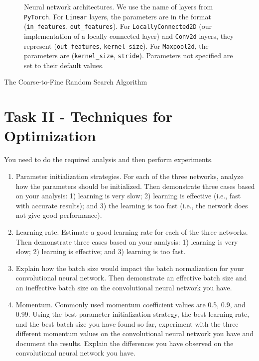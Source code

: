\documentclass[
	12pt, %
]{../Template/fphw}
\begin{document}
\begin{figure}[!htbp]
\begin{tikzpicture}[x=0.75pt,y=0.75pt,yscale=-1,xscale=1]
\end{tikzpicture}
    \caption{Neural network architectures. We use the name of layers from \texttt{PyTorch}\cite{pytorch}. For \texttt{Linear} layers, the parameters are in the format (\texttt{in\_features}, \texttt{out\_features}). For \texttt{LocallyConnected2D} (our implementation of a locally connected layer) and \texttt{Conv2d} layers, they represent (\texttt{out\_features}, \texttt{kernel\_size}). For \texttt{Maxpool2d}, the parameters are (\texttt{kernel\_size}, \texttt{stride}). Parameters not specified are set to their default values.}
    \label{fig:p1_architectures}

\end{figure}

\begin{algorithm}
        \caption{The Coarse-to-Fine Random Search Algorithm}\label{alg:NAS}
        \begin{algorithmic}
         \State   
        \end{algorithmic}
\end{algorithm}

\section*{Task II - Techniques for Optimization}

\begin{problem}
You need to do the required analysis and then perform experiments.
\begin{enumerate}[label = (\arabic*)]
\item Parameter initialization strategies. For each of the three networks, analyze how the parameters should
be initialized. Then demonstrate three cases based on your analysis: 1) learning is very slow; 2)
learning is effective (i.e., fast with accurate results); and 3) the learning is too fast (i.e., the network
does not give good performance).
\item Learning rate. Estimate a good learning rate for each of the three networks. Then demonstrate three
cases based on your analysis: 1) learning is very slow; 2) learning is effective; and 3) learning is too
fast.
\item Explain how the batch size would impact the batch normalization for your convolutional neural
network. Then demonstrate an effective batch size and an ineffective batch size on the convolutional
neural network you have.
\item Momentum. Commonly used momentum coefficient values are 0.5, 0.9, and 0.99. Using the best
parameter initialization strategy, the best learning rate, and the best batch size you have found so far,
experiment with the three different momentum values on the convolutional neural network you have
and document the results. Explain the differences you have observed on the convolutional neural
network you have.
\end{enumerate}

\end{problem}
\end{document}
